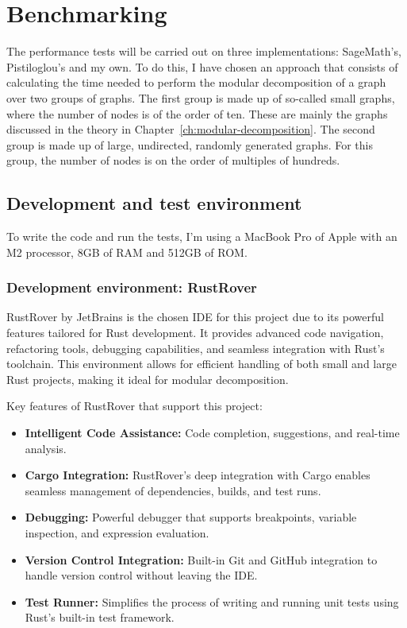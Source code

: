 

\chapter{Benchmarking}\label{ch:benchmarking}

The performance tests will be carried out on three implementations: SageMath's, Pistiloglou's and my own.
To do this, I have chosen an approach that consists of calculating the time needed to perform the modular decomposition of a graph over two groups of graphs.
The first group is made up of so-called small graphs, where the number of nodes is of the order of ten.
These are mainly the graphs discussed in the theory in Chapter~\ref{ch:modular-decomposition}.
The second group is made up of large, undirected, randomly generated graphs.
For this group, the number of nodes is on the order of multiples of hundreds.

\section{Development and test environment}\label{sec:development-and-test-environment}

To write the code and run the tests, I'm using a MacBook Pro of Apple with an M2 processor, 8GB of RAM and 512GB of ROM\cite{macbookprom2}.

\subsection{Development environment: RustRover}\label{subsec:development-environment-rustrover}

RustRover\cite{rustrover} by JetBrains\cite{jetbrains} is the chosen IDE for this project due to its powerful features tailored for Rust development.
It provides advanced code navigation, refactoring tools, debugging capabilities, and seamless integration with Rust's toolchain.
This environment allows for efficient handling of both small and large Rust projects, making it ideal for modular decomposition.

Key features of RustRover that support this project:
\begin{itemize}
    \item \textbf{Intelligent Code Assistance:} Code completion, suggestions, and real-time analysis.
    \item \textbf{Cargo Integration:} RustRover's deep integration with Cargo enables seamless management of dependencies, builds, and test runs.
    \item \textbf{Debugging:} Powerful debugger that supports breakpoints, variable inspection, and expression evaluation.
    \item \textbf{Version Control Integration:} Built-in Git and GitHub integration to handle version control without leaving the IDE\@.
    \item \textbf{Test Runner:} Simplifies the process of writing and running unit tests using Rust’s built-in test framework.
\end{itemize}

